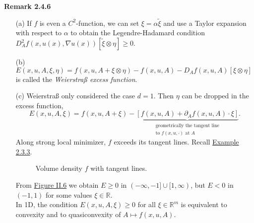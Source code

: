 \textbf{Remark 2.4.6}
\begin{itemize}
	\item[(a)] If $f$ is even a $C^2$-function, we can set $\xi=\alpha\tilde{\xi}$ and use a Taylor expansion with respect to $\alpha$ to obtain the Legendre-Hadamard condition $D_A^2f(x,u(x),\nabla u(x))[\tilde{\xi}\otimes\eta]\geq0$.
	\item[(b)] $E(x,u,A,\xi,\eta)=f(x,u,A+\xi\otimes\eta)-f(x,u,A)-D_Af(x,u,A)[\xi\otimes\eta]$ is called the \textit{Weierstra{\ss} excess function}.
	\item[(c)] Weierstra{\ss} only considered the case $d=1$. Then $\eta$ can be dropped in the excess function,
	\[E(x,u,A,\xi)=f(x,u,A+\xi)-\underbrace{[f(x,u,A)+\partial_Af(x,u,A)\cdot\xi]}_{\substack{\text{geometrically the tangent line}\\\text{to }f(x,u,\cdot)\text{ at }A}}.\]
	Along strong local minimizer, $f$ \glqq exceeds\grqq{} its tangent lines. Recall \hyperlink{example_2_3_3}{Example 2.3.3}.

	\begin{figure}[ht]
		\centering
		\caption{Volume density $f$ with tangent lines.}
		\label{fig:remark_2_4_6}
	\end{figure}

	From \hyperref[fig:remark_2_4_6]{Figure II.6} we obtain $E\geq0$ in $(-\infty,-1]\cup[1,\infty)$, but $E<0$ in $(-1,1)$ for some values $\xi\in\mathbb{R}$.\\

	In 1D, the condition $E(x,u,A,\xi)\geq0$ for all $\xi\in\mathbb{R}^m$ is equivalent to convexity and to quasiconvexity of $A\longmapsto f(x,u,A)$.\\[11pt]
\end{itemize}

